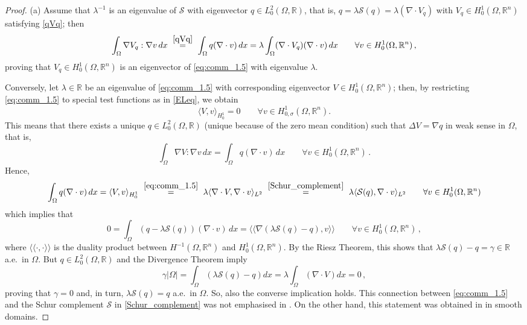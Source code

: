 \documentclass[11pt]{article}
\theoremstyle{plain}
\theoremstyle{definition}
\numberwithin{equation}{section}
\newcommand{\R}{\mathbb{R}}
\begin{document}
\begin{proof}
(a) Assume that $\lambda^{-1}$ is an eigenvalue of $\mathcal{S}$ with eigenvector $q\in L^2_0(\Omega,\R)$, that is, $q=\lambda\mathcal{S}(q)=\lambda(\nabla\cdot V_q)$ with $V_{q} \in H_{0}^{1}(\Omega,\R^n)$
satisfying \eqref{qVq}; then
$$
\int_{\Omega} \nabla V_{q} : \nabla v \, dx\ \stackrel{\eqref{qVq}}{=}\ \int_{\Omega} q(\nabla \cdot v) \, dx=
\lambda\int_{\Omega} (\nabla \cdot V_q)(\nabla \cdot v) \, dx \qquad \forall v \in H_{0}^{1}(\Omega,\R^n) \, ,
$$
proving that $V_q\in H^1_0(\Omega,\R^n)$ is an eigenvector of \eqref{eq:comm_1.5} with eigenvalue $\lambda$.\par
Conversely, let $\lambda\in\R$ be an eigenvalue of \eqref{eq:comm_1.5} with corresponding eigenvector $V\in H^1_0(\Omega,\R^n)$; then,
by restricting \eqref{eq:comm_1.5} to special test functions as in \eqref{ELeq}, we obtain
$$
\langle V,v\rangle_{H^1_0} =0\qquad \forall v\in  H^1_{0,\sigma}(\Omega,\R^n).
$$
This means that there exists a unique $q\in L^2_0(\Omega,\R)$ (unique because of the zero mean condition) such that
$\Delta V = \nabla q$ in weak sense in $\Omega$, that is,
$$
\int_{\Omega} \nabla V : \nabla v \, dx = \int_{\Omega} q(\nabla \cdot v) \, dx \qquad \forall v \in H_{0}^{1}(\Omega,\R^n) \, .
$$
Hence,
$$
\int_{\Omega} q(\nabla \cdot v) \, dx=\langle V,v\rangle_{H^1_0}\ \stackrel{\eqref{eq:comm_1.5}}{=}\ \lambda \langle \nabla\cdot V,\nabla \cdot v \rangle_{L^2}
\ \stackrel{\eqref{Schur_complement}}{=}\ \lambda \langle \mathcal{S}(q),\nabla \cdot v \rangle_{L^2}\qquad \forall v\in  H^1_{0}(\Omega,\R^n)
$$
which implies that
$$
0=\int_{\Omega}(q-\lambda\mathcal{S}(q))(\nabla \cdot v) \, dx=\langle\langle\nabla(\lambda\mathcal{S}(q)-q),v\rangle\rangle\qquad \forall v\in  H^1_{0}(\Omega,\R^n) \, ,
$$
where $\langle\langle\cdot,\cdot\rangle\rangle$ is the duality product between $H^{-1}(\Omega,\R^n)$ and $H^1_{0}(\Omega,\R^n)$.
By the Riesz Theorem, this shows that $\lambda\mathcal{S}(q)-q=\gamma\in\R$ a.e.\ in $\Omega$. But $q\in L^2_0(\Omega,\R)$ and the Divergence Theorem imply
$$
\gamma|\Omega|=\int_\Omega(\lambda\mathcal{S}(q)-q)dx=\lambda\int_\Omega(\nabla\cdot V)dx=0\, ,
$$
proving that $\gamma=0$ and, in turn, $\lambda\mathcal{S}(q)=q$ a.e.\ in $\Omega$. So, also the converse implication holds.
This connection between \eqref{eq:comm_1.5} and the Schur complement $\mathcal{S}$ in \eqref{Schur_complement} was not emphasised in
\cite{Velte_LNM1431_1990}. On the other hand, this statement was obtained in \cite[Theorem 1.4]{weyers2006q} in smooth domains.\par

\end{proof}
\end{document}
